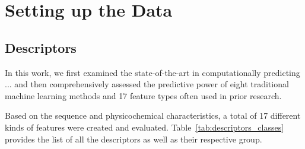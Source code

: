 \section{Setting up the Data}

\subsection{Descriptors}
\label{cha:descriptors}

In this work, we first examined the state-of-the-art in computationally predicting ... and then comprehensively assessed the predictive power of eight traditional machine learning methods and 17 feature types often used in prior research.

Based on the sequence and physicochemical characteristics, a total of 17 different kinds of features were created and evaluated. Table~\ref{tab:descriptors_classes} provides the list of all the descriptors as well as their respective group.

